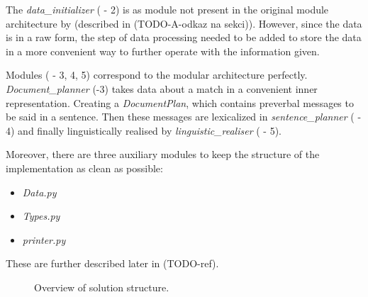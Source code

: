 The \emph{data\_initializer} ( - 2) is as module not present in the original module architecture by \cite{reiter1997building} (described in (TODO-A-odkaz na sekci)). However, since the data is in a raw form, the step of data processing needed to be added to store the data in a more convenient way to further operate with the information given.

Modules ( - 3, 4, 5) correspond to the modular architecture perfectly. \emph{Document\_planner} (-3) takes data about a match in a convenient inner representation. Creating a \emph{DocumentPlan}, which contains preverbal messages to be said in a sentence. Then these messages are lexicalized in \emph{sentence\_planner} ( - 4) and finally linguistically realised by \emph{linguistic\_realiser} ( - 5). 

Moreover, there are three auxiliary modules to keep the structure of the implementation as clean as possible:
\begin{itemize}
	\item \emph{Data.py}
	\item \emph{Types.py}
	\item \emph{printer.py}
\end{itemize}
These are further described later in (TODO-ref).

\begin{figure}[p]
	\caption{Overview of solution structure.}
	\label{fig:structure}
\end{figure}


